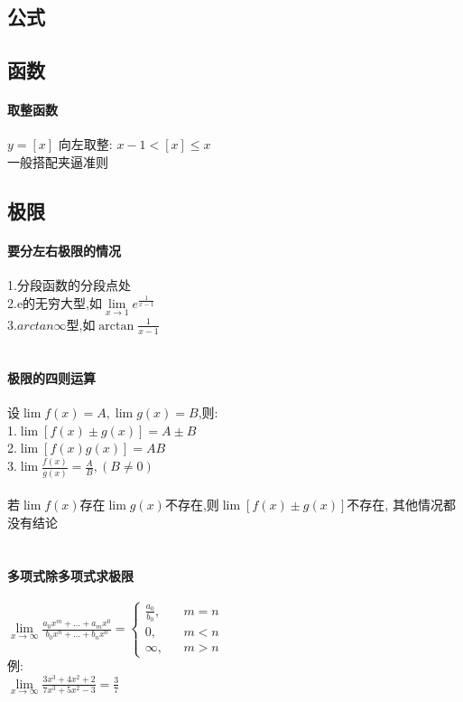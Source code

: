 \documentclass{article}
\begin{document}
\begin{flushleft}
	\huge
	
	\section{公式}
	
	\subsection{函数}
	
	\paragraph{取整函数}
	$y=[x]$ 向左取整: $x-1<[x]\leq x$\\
	一般搭配夹逼准则\\

	\subsection{极限}
	
	\paragraph{要分左右极限的情况}
	1.分段函数的分段点处\\
	2.e的无穷大型,如$\lim\limits_{x\to 1} e^{\frac{1}{x-1}}$\\
	3.$arctan\infty$型,如$\arctan{\frac{1}{x-1}}$\\
	~\\
	\paragraph{极限的四则运算}
	设$\lim f(x)=A,\lim g(x)=B$,则:\\
	1.$\lim [f(x)\pm g(x)]=A\pm B$\\
	2.$\lim [f(x)g(x)]=AB$\\
	3.$\lim \frac{f(x)}{g(x)} =\frac{A}{B},(B\neq 0)$\\
	~\\
	若$\lim f(x)$存在$\lim g(x)$不存在,则$\lim [f(x)\pm g(x)]$不存在, 其他情况都没有结论\\
	~\\
	\paragraph{多项式除多项式求极限}
	$\lim\limits_{x\to \infty} \frac{a_0x^m+...+a_mx^0}{b_0x^n+...+b_nx^0}=
	\left\{
	\begin{array}{rcl}
	\frac{a_0}{b_0}, & & {m=n}\\
	0, & & {m<n}\\
	\infty, & & {m>n}
	\end{array} \right.$\\
	例:\\
	$\lim\limits_{x\to \infty} \frac{3x^3+4x^2+2}{7x^3+5x^2-3} = \frac{3}{7}$\\
	~\\

\end{flushleft}
\end{document}
